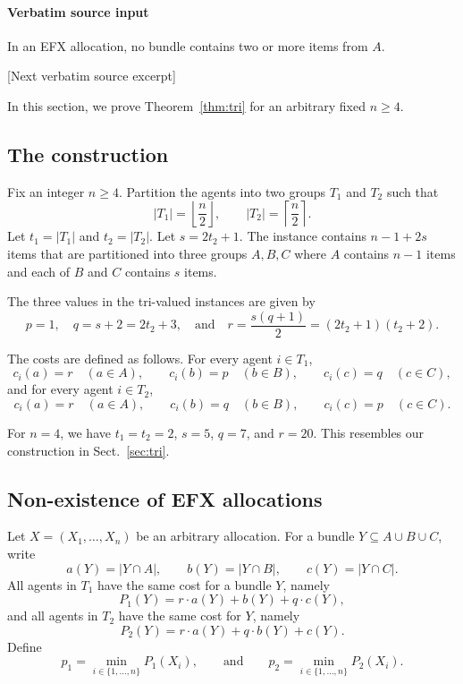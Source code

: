 \documentclass[10pt]{article}
\begin{document}
\paragraph{Verbatim source input}
\begin{ReviewVerbatim}
\begin{proposition}
    In an EFX allocation, no bundle contains two or more items from $A$.
\end{proposition}

[Next verbatim source excerpt]

In this section, we prove Theorem~\ref{thm:tri} for an arbitrary fixed $n\geq 4$.

\subsection{The construction}
Fix an integer $n\ge 4$. Partition the agents into two groups $T_1$ and $T_2$ such that
\[
    |T_1|=\left\lfloor \frac n2\right\rfloor,
    \qquad
    |T_2|=\left\lceil \frac n2\right\rceil.
\]
Let $t_1=|T_1|$ and $t_2=|T_2|$.
Let $s=2t_2+1$.
The instance contains $n-1+2s$ items that are partitioned into three groups $A,B,C$ where $A$ contains $n-1$ items and each of $B$ and $C$ contains $s$ items.

The three values in the tri-valued instances are given by
$$p=1,\quad q=s+2=2t_2+3,\quad\mbox{and}\quad r=\frac{s(q+1)}2=(2t_2+1)(t_2+2).$$


The costs are defined as follows. For every agent $i\in T_1$,
\[
    c_i(a)=r \quad(a\in A),
    \qquad
    c_i(b)=p \quad(b\in B),
    \qquad
    c_i(c)=q \quad(c\in C),
\]
and for every agent $i\in T_2$,
\[
    c_i(a)=r \quad(a\in A),
    \qquad
    c_i(b)=q \quad(b\in B),
    \qquad
    c_i(c)=p \quad(c\in C).
\]

For $n=4$, we have $t_1=t_2=2$, $s=5$, $q=7$, and $r=20$.
This resembles our construction in Sect.~\ref{sec:tri}.

\subsection{Non-existence of EFX allocations}
Let $X=(X_1,\ldots,X_n)$ be an arbitrary allocation. For a bundle $Y\subseteq A\cup B\cup C$, write
\[
    a(Y)=|Y\cap A|,
    \qquad
    b(Y)=|Y\cap B|,
    \qquad
    c(Y)=|Y\cap C|.
\]
All agents in $T_1$ have the same cost for a bundle $Y$, namely
\[
    P_1(Y)=r\cdot a(Y)+b(Y)+q\cdot c(Y),
\]
and all agents in $T_2$ have the same cost for $Y$, namely
\[
    P_2(Y)=r\cdot  a(Y)+q\cdot b(Y)+c(Y).
\]
Define
\[
    p_1=\min_{i\in \{1,\ldots,n\}} P_1(X_i),
    \qquad\mbox{and}\qquad
    p_2=\min_{i\in \{1,\ldots,n\}} P_2(X_i).
\]
\end{ReviewVerbatim}
\end{document}
